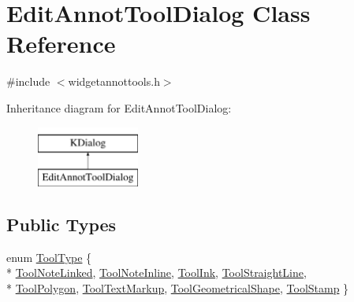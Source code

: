 \hypertarget{classEditAnnotToolDialog}{\section{Edit\+Annot\+Tool\+Dialog Class Reference}
\label{classEditAnnotToolDialog}
}


{\ttfamily \#include $<$widgetannottools.\+h$>$}

Inheritance diagram for Edit\+Annot\+Tool\+Dialog\+:\begin{figure}[H]
\begin{center}
\leavevmode
\includegraphics[height=2.000000cm]{classEditAnnotToolDialog}
\end{center}
\end{figure}
\subsection*{Public Types}
\begin{DoxyCompactItemize}
\item 
enum \hyperlink{classEditAnnotToolDialog_ae4572c0cf4fc351cf03e4d86ef595a9c}{Tool\+Type} \{ \\*
\hyperlink{classEditAnnotToolDialog_ae4572c0cf4fc351cf03e4d86ef595a9ca87068985a2e61ea99764542268551c13}{Tool\+Note\+Linked}, 
\hyperlink{classEditAnnotToolDialog_ae4572c0cf4fc351cf03e4d86ef595a9ca198ea29d3ebd27d859c47c7d7e0499e2}{Tool\+Note\+Inline}, 
\hyperlink{classEditAnnotToolDialog_ae4572c0cf4fc351cf03e4d86ef595a9caef2e195c93ecc9f1d6bd1dae0deb5c19}{Tool\+Ink}, 
\hyperlink{classEditAnnotToolDialog_ae4572c0cf4fc351cf03e4d86ef595a9ca28043180b87b79e0defc7b99eddb6c0d}{Tool\+Straight\+Line}, 
\\*
\hyperlink{classEditAnnotToolDialog_ae4572c0cf4fc351cf03e4d86ef595a9ca671b22e9e16f80ad1e4c9fa2fb5cfba9}{Tool\+Polygon}, 
\hyperlink{classEditAnnotToolDialog_ae4572c0cf4fc351cf03e4d86ef595a9ca1f78ead80c77ac8dba06e80f011959c3}{Tool\+Text\+Markup}, 
\hyperlink{classEditAnnotToolDialog_ae4572c0cf4fc351cf03e4d86ef595a9ca49c38af01e3175f811c5077019137e0a}{Tool\+Geometrical\+Shape}, 
\hyperlink{classEditAnnotToolDialog_ae4572c0cf4fc351cf03e4d86ef595a9ca7cc3433c386c961f1ba62c445958da3d}{Tool\+Stamp}
 \}
\end{DoxyCompactItemize}
